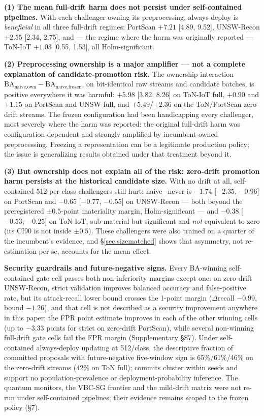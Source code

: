 \documentclass[a4paper,fleqn]{cas-sc}
\begin{document}
\textbf{(1) The mean full-drift harm does not persist under self-contained pipelines.} With each challenger owning its preprocessing, always-deploy is \emph{beneficial} in all three full-drift regimes: PortScan $+7.21$ [4.89, 9.52], UNSW-Recon $+2.55$ [2.34, 2.75], and --- the regime where the harm was originally reported --- ToN-IoT $+1.03$ [0.55, 1.53], all Holm-significant.

\textbf{(2) Preprocessing ownership is a major amplifier --- not a complete explanation of candidate-promotion risk.} The ownership interaction $\mathrm{BA}_{\text{naive,own}} - \mathrm{BA}_{\text{naive,frozen}}$, on bit-identical raw streams and candidate batches, is positive everywhere it was harmful: $+5.98$ [3.82, 8.26] on ToN-IoT full, $+0.90$ and $+1.15$ on PortScan and UNSW full, and $+5.49$/$+2.36$ on the ToN/PortScan zero-drift streams. The frozen configuration had been handicapping every challenger, most severely where the harm was reported: the original full-drift harm was configuration-dependent and strongly amplified by incumbent-owned preprocessing. Freezing a representation can be a legitimate production policy; the issue is generalizing results obtained under that treatment beyond it.

\textbf{(3) But ownership does not explain all of the risk: zero-drift promotion harm persists at the historical candidate size.} With no drift at all, self-contained 512-per-class challengers still hurt: naive$-$never is $-1.74$ [$-2.35$, $-0.96$] on PortScan and $-0.65$ [$-0.77$, $-0.55$] on UNSW-Recon --- both beyond the preregistered $\pm0.5$-point materiality margin, Holm-significant --- and $-0.38$ [$-0.53$, $-0.25$] on ToN-IoT, sub-material but significant and \emph{not} equivalent to zero (its CI90 is not inside $\pm0.5$). These challengers were also trained on a quarter of the incumbent's evidence, and \S\ref{sec:sizematched} shows that asymmetry, not re-estimation per se, accounts for the mean effect.



\textbf{Security guardrails and future-negative signs.} Every BA-winning self-contained gate cell passes both non-inferiority margins except one: on zero-drift UNSW-Recon, strict validation improves balanced accuracy and false-positive rate, but its attack-recall lower bound crosses the 1-point margin ($\Delta$recall $-0.99$, bound $-1.26$), and that cell is not described as a security improvement anywhere in this paper; the FPR point estimate improves in each of the other winning cells (up to $-3.33$ points for strict on zero-drift PortScan), while several non-winning full-drift gate cells fail the FPR margin (Supplementary \S S7). Under self-contained always-deploy updating at 512/class, the descriptive fraction of committed proposals with future-negative five-window sign is 65\%/61\%/46\% on the zero-drift streams (42\% on ToN full); commits cluster within seeds and support no population-prevalence or deployment-probability inference. The quantum monitors, the VBC-SG frontier and the mild-drift matrix were not re-run under self-contained pipelines; their evidence remains scoped to the frozen policy (\S7).
\end{document}
